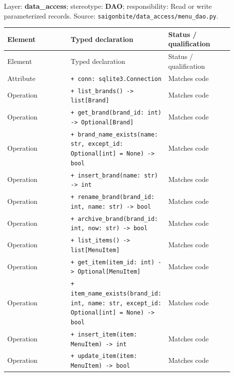 Layer: \textbf{data\_access}; stereotype: \textbf{\guillemotleft{}DAO\guillemotright{}}; responsibility: Read or write parameterized records. Source: \texttt{saigonbite/\allowbreak{}data\_\allowbreak{}access/\allowbreak{}menu\_\allowbreak{}dao.\allowbreak{}py}.

\begin{longtable}{>{\raggedright\arraybackslash}p{0.3067\linewidth}>{\raggedright\arraybackslash}p{0.3067\linewidth}>{\raggedright\arraybackslash}p{0.3067\linewidth}}
Element & Typed declaration & Status / qualification \\
\hline\endfirsthead
Element & Typed declaration & Status / qualification \\
\hline\endhead
Attribute & \texttt{+ conn: sqlite3.\allowbreak{}Connection} & Matches code \\
Operation & \texttt{+ list\_\allowbreak{}brands() -\textgreater{} list[Brand]} & Matches code \\
Operation & \texttt{+ get\_\allowbreak{}brand(brand\_\allowbreak{}id: int) -\textgreater{} Optional[Brand]} & Matches code \\
Operation & \texttt{+ brand\_\allowbreak{}name\_\allowbreak{}exists(name: str, except\_\allowbreak{}id: Optional[int] = None) -\textgreater{} bool} & Matches code \\
Operation & \texttt{+ insert\_\allowbreak{}brand(name: str) -\textgreater{} int} & Matches code \\
Operation & \texttt{+ rename\_\allowbreak{}brand(brand\_\allowbreak{}id: int, name: str) -\textgreater{} bool} & Matches code \\
Operation & \texttt{+ archive\_\allowbreak{}brand(brand\_\allowbreak{}id: int, now: str) -\textgreater{} bool} & Matches code \\
Operation & \texttt{+ list\_\allowbreak{}items() -\textgreater{} list[MenuItem]} & Matches code \\
Operation & \texttt{+ get\_\allowbreak{}item(item\_\allowbreak{}id: int) -\textgreater{} Optional[MenuItem]} & Matches code \\
Operation & \texttt{+ item\_\allowbreak{}name\_\allowbreak{}exists(brand\_\allowbreak{}id: int, name: str, except\_\allowbreak{}id: Optional[int] = None) -\textgreater{} bool} & Matches code \\
Operation & \texttt{+ insert\_\allowbreak{}item(item: MenuItem) -\textgreater{} int} & Matches code \\
Operation & \texttt{+ update\_\allowbreak{}item(item: MenuItem) -\textgreater{} bool} & Matches code \\

\end{longtable}
